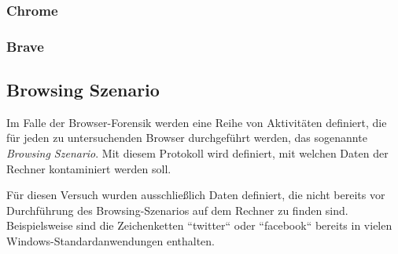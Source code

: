 \subsubsection*{Chrome}
\label{subsubsection:methodik-vorbereitung-browserauswahl-chrome}

\subsubsection*{Brave}
\label{subsubsection:methodik-vorbereitung-browserauswahl-brave}

\subsection{Browsing Szenario}
\label{subsection:methodik-vorbereitung-browsing-szenario}
Im Falle der Browser-Forensik werden eine Reihe von Aktivitäten definiert, die für jeden zu untersuchenden Browser durchgeführt werden, das sogenannte \textit{Browsing Szenario}.
Mit diesem Protokoll wird definiert, mit welchen Daten der Rechner kontaminiert werden soll.

Für diesen Versuch wurden ausschließlich Daten definiert, die nicht bereits vor Durchführung des Browsing-Szenarios auf dem Rechner zu finden sind. Beispielsweise sind die Zeichenketten ``twitter`` oder ``facebook`` bereits in vielen Windows-Standardanwendungen enthalten.

